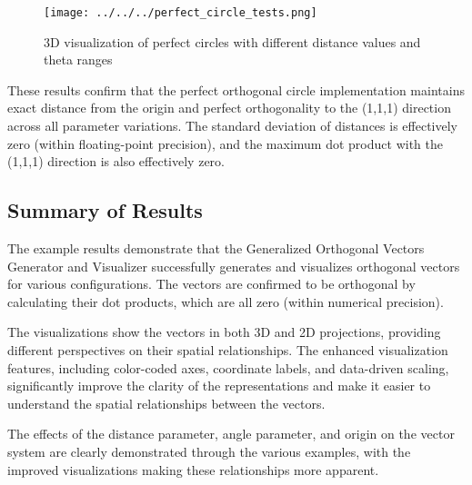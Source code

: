 \begin{figure}[H]
    \centering
    \texttt{[image: ../../../perfect\_circle\_tests.png]}
    \caption{3D visualization of perfect circles with different distance values and theta ranges}
    \label{fig:perfect_circle_tests}
\end{figure}

These results confirm that the perfect orthogonal circle implementation maintains exact distance from the origin and perfect orthogonality to the (1,1,1) direction across all parameter variations. The standard deviation of distances is effectively zero (within floating-point precision), and the maximum dot product with the (1,1,1) direction is also effectively zero.


\subsection{Summary of Results}

The example results demonstrate that the Generalized Orthogonal Vectors Generator and Visualizer successfully generates and visualizes orthogonal vectors for various configurations. The vectors are confirmed to be orthogonal by calculating their dot products, which are all zero (within numerical precision).

The visualizations show the vectors in both 3D and 2D projections, providing different perspectives on their spatial relationships. The enhanced visualization features, including color-coded axes, coordinate labels, and data-driven scaling, significantly improve the clarity of the representations and make it easier to understand the spatial relationships between the vectors.

The effects of the distance parameter, angle parameter, and origin on the vector system are clearly demonstrated through the various examples, with the improved visualizations making these relationships more apparent.

